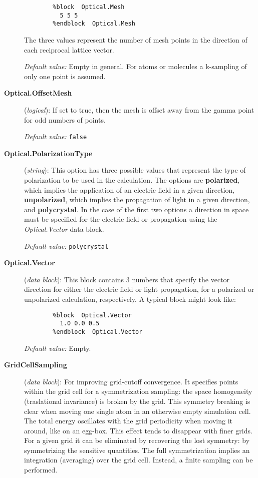 \documentclass[11pt]{article}
\begin{document}
\begin{description}
\begin{verbatim}
        %block  Optical.Mesh
          5 5 5
        %endblock  Optical.Mesh
\end{verbatim}

The three values represent the number of mesh points in
the direction of each reciprocal lattice vector.

{\it Default value:} Empty in general. For atoms 
or molecules a k-sampling of only one point is assumed.

\item[{\bf Optical.OffsetMesh}] ({\it logical}):
If set to true, then the mesh is offset away from the
gamma point for odd numbers of points.

{\it Default value:} {\tt false}

\item[{\bf Optical.PolarizationType}] ({\it string}):
This option has three possible values that represent the
type of polarization to be used in the calculation. The options
are {\bf polarized}, which implies the application of an electric
field in a given direction, {\bf unpolarized}, which implies the
propagation of light in a given direction, and {\bf polycrystal}.
In the case of the first two options a direction in space must
be specified for the electric field or propagation using the
{\it Optical.Vector} data block.

{\it Default value:} {\tt polycrystal}

\item[{\bf Optical.Vector}] ({\it data block}):
This block contains 3 numbers that specify the vector direction
for either the electric field or light propagation, for a polarized
or unpolarized calculation, respectively. A typical block might look
like:

\begin{verbatim}
        %block  Optical.Vector
          1.0 0.0 0.5
        %endblock  Optical.Vector
\end{verbatim}

{\it Default value:} Empty.


\item[{\bf GridCellSampling}] ({\it data block}): 
For improving grid-cutoff convergence. It specifies points within
the grid cell for a symmetrization sampling: the space 
homogeneity (traslational invariance)
is broken by the grid. This symmetry breaking is clear
when moving one single atom in an otherwise empty simulation cell.
The total energy oscillates with the grid periodicity when moving
it around, like on an egg-box. This effect tends to disappear with 
finer grids. For a given grid it can be eliminated
by recovering the lost symmetry: by symmetrizing the sensitive
quantities. The full symmetrization implies an integration (averaging)
over the grid cell. Instead, a finite sampling can be performed.


\end{description}
\end{document}
